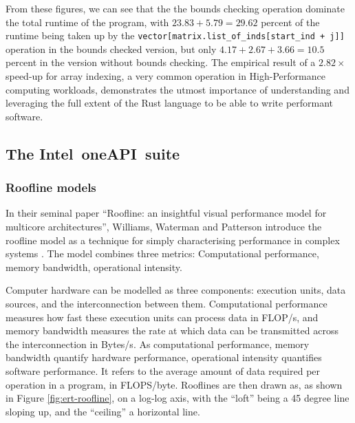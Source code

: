 From these figures, we can see that the the bounds checking operation dominate the total runtime of the program, with $23.83 + 5.79 = 29.62$ percent of the runtime being taken up by the \texttt{vector[matrix.list_of_inds[start_ind + j]]} operation in the bounds checked version, but only $4.17 + 2.67 + 3.66 = 10.5$ percent in the version without bounds checking. The empirical result of a $2.82\times$ speed-up for array indexing, a very common operation in High-Performance computing workloads, demonstrates the utmost importance of understanding and leveraging the full extent of the Rust language to be able to write performant software.


\subsection{The Intel\textregistered\ oneAPI\texttrademark\ suite}
\label{ssec:intel-advisor-profiler}

\subsubsection{Roofline models}
\label{sssec:roofline-models}

In their seminal paper ``Roofline: an insightful visual performance model for multicore architectures'', Williams, Waterman and Patterson introduce the roofline model as a technique for simply characterising performance in complex systems \cite{williamsRooflineInsightfulVisual2009}. The model combines three metrics: Computational performance, memory bandwidth, operational intensity.

Computer hardware can be modelled as three components: execution units, data sources, and the interconnection between them. Computational performance measures how fast these execution units can process data in FLOP/s, and memory bandwidth measures the rate at which data can be transmitted across the interconnection in Bytes/s. As computational performance, memory bandwidth quantify hardware performance, operational intensity quantifies software performance. It refers to the average amount of data required per operation in a program, in FLOPS/byte. Rooflines are then drawn as, as shown in Figure \ref{fig:ert-roofline}, on a log-log axis, with the ``loft'' being a 45 degree line sloping up, and the ``ceiling'' a horizontal line.

